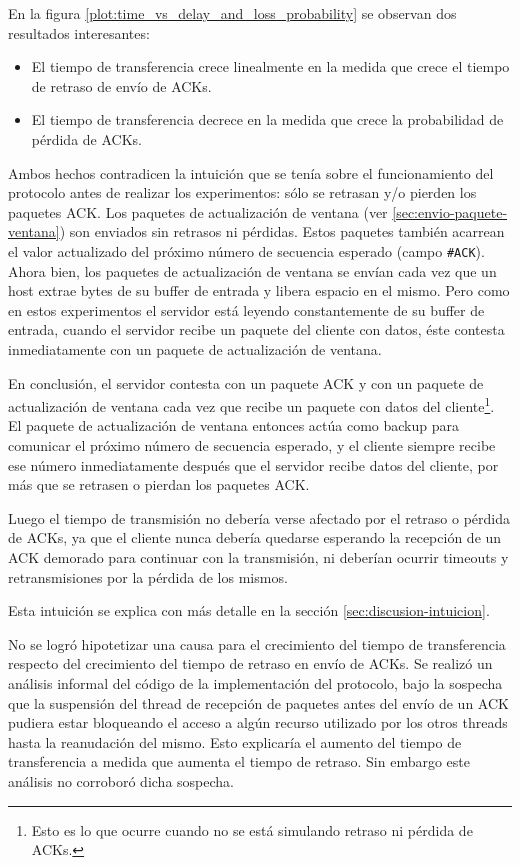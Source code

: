\documentclass[a4paper, 10pt, twoside]{article}
\newcommand{\ack}{\texttt{\#ACK}\xspace}
\begin{document}
En la figura \ref{plot:time_vs_delay_and_loss_probability} se observan dos resultados interesantes:

\begin{itemize}
  \item El tiempo de transferencia crece linealmente en la medida que crece el tiempo de retraso de envío de ACKs.

  \item El tiempo de transferencia decrece en la medida que crece la probabilidad de pérdida de ACKs.
\end{itemize}

Ambos hechos contradicen la intuición que se tenía sobre el funcionamiento del protocolo antes de realizar los experimentos: sólo se retrasan y/o pierden los paquetes ACK. Los paquetes de actualización de ventana (ver \ref{sec:envio-paquete-ventana}) son enviados sin retrasos ni pérdidas. Estos paquetes también acarrean el valor actualizado del próximo número de secuencia esperado (campo \ack). Ahora bien, los paquetes de actualización de ventana se envían cada vez que un host extrae bytes de su buffer de entrada y libera espacio en el mismo. Pero como en estos experimentos el servidor está leyendo constantemente de su buffer de entrada, cuando el servidor recibe un paquete del cliente con datos, éste contesta inmediatamente con un paquete de actualización de ventana.

En conclusión, el servidor contesta con un paquete ACK y con un paquete de actualización de ventana cada vez que recibe un paquete con datos del cliente\footnote{Esto es lo que ocurre cuando no se está simulando retraso ni pérdida de ACKs.}. El paquete de actualización de ventana entonces actúa como backup para comunicar el próximo número de secuencia esperado, y el cliente siempre recibe ese número inmediatamente después que el servidor recibe datos del cliente, por más que se retrasen o pierdan los paquetes ACK.

Luego el tiempo de transmisión no debería verse afectado por el retraso o pérdida de ACKs, ya que el cliente nunca debería quedarse esperando la recepción de un ACK demorado para continuar con la transmisión, ni deberían ocurrir timeouts y retransmisiones por la pérdida de los mismos.

Esta intuición se explica con más detalle en la sección \ref{sec:discusion-intuicion}. 

No se logró hipotetizar una causa para el crecimiento del tiempo de transferencia respecto del crecimiento del tiempo de retraso en envío de ACKs. Se realizó un análisis informal del código de la implementación del protocolo, bajo la sospecha que la suspensión del thread de recepción de paquetes antes del envío de un ACK pudiera estar bloqueando el acceso a algún recurso utilizado por los otros threads hasta la reanudación del mismo. Esto explicaría el aumento del tiempo de transferencia a medida que aumenta el tiempo de retraso. Sin embargo este análisis no corroboró dicha sospecha.
\end{document}
